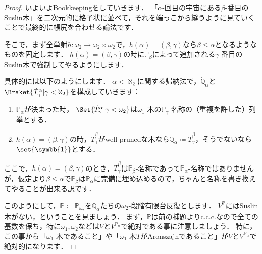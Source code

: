 \documentclass[a4j]{ltjsarticle}
\newcommand{\mathds}[1]{\symbb{#1}}
\renewcommand{\defeq}{\mathrel{\coloneq}}
\begin{document}
\begin{proof}
 いよいよBookkeepingをしていきます．
 「$\alpha$-回目の宇宙にある$\beta$-番目のSuslin木」を二次元的に格子状に並べて，それを端っこから縫うように見ていくことで最終的に帳尻を合わせる論法です．

 そこで，まず全単射$h: \omega_2 \to \omega_2 \times \omega_2$で，$h(\alpha) = (\beta, \gamma)$なら$\beta \leq \alpha$となるようなものを固定します．
 $h(\alpha) = (\beta, \gamma)$の時に$\mathbb{P}_\beta$によって追加される$\gamma$-番目のSuslin木で強制してやるようにします．
 
 具体的には以下のようにします．
 $\alpha < \aleph_2$に関する帰納法で，$\dot{\mathbb{Q}}_\alpha$と$\Braket{\dot{T}^\alpha_\gamma | \gamma < \aleph_2}$を構成していきます：
 \begin{enumerate}
  \item $\mathbb{P}_\alpha$が決まった時，
        $\Set{\dot{T}^\alpha_\gamma | \gamma < \omega_2}$は$\omega_1$-木の$\mathbb{P}_\gamma$-名称の（重複を許した）列挙とする．
  \item $h(\alpha) = (\beta, \gamma)$の時，$\dot{T}^\beta_\gamma$がwell-prunedな木なら$\dot{\mathbb{Q}}_\alpha \defeq \dot{T}^\beta_\gamma$，そうでないなら$\set{\mathds{1}}$とする．
 \end{enumerate}
 ここで，$h(\alpha) = (\beta, \gamma)$のとき，$\dot{T}^\beta_\gamma$は$\mathbb{P}_\beta$-名称であって$\mathbb{P}_\alpha$-名称ではありませんが，仮定より$\beta \leq \alpha$で$\mathbb{P}_\beta$は$\mathbb{P}_\alpha$に完備に埋め込めるので，ちゃんと名称を書き換えてやることが出来る訳です．

 このようにして，$\mathbb{P} \defeq \mathbb{P}_{\omega_2}$を$\mathbb{Q}_\alpha$たちの$\omega_2$-段階有限台反復とします．
 $V^{\mathbb{P}}$にはSuslin木がない，ということを見ましょう．
 まず，$\mathbb{P}$は前の補題よりc.c.c.なので全ての基数を保ち，特に$\omega_1, \omega_2$などは$V$と$V^{\mathbb{P}_\alpha}$で絶対である事に注意しましょう．
 特に，この事から「$\omega_1$-木であること」や「$\omega_1$-木$T$がAronszajnであること」が$V$と$V^{\mathbb{P}_\alpha}$で絶対的になります．


\end{proof}
\end{document}
